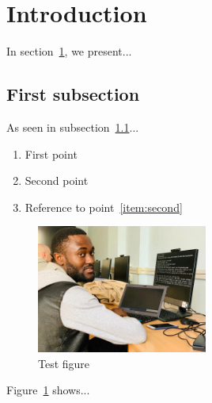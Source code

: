 \documentclass{article}
\begin{document}
\section{Introduction}
\label{sec:intro}

In section~\ref{sec:intro}, we present...

\subsection{First subsection}
\label{subsec:first}

As seen in subsection~\ref{subsec:first}...

\begin{enumerate}
    \item First point
    \item Second point\label{item:second}
    \item Reference to point~\ref{item:second}
\end{enumerate}

\begin{figure}[ht]
    \centering
    \includegraphics[width=0.5\textwidth]{siriki}
    \caption{Test figure}
    \label{fig:test}
\end{figure}

Figure~\ref{fig:test} shows...
\end{document}
